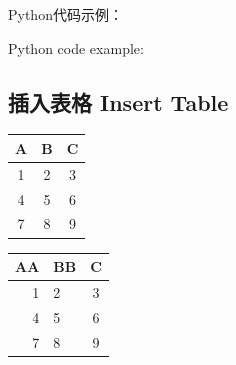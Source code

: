\documentclass{article}
\begin{document}


\vspace{0.5cm}

Python代码示例：

Python code example:





\subsection{插入表格 Insert Table}

\begin{multicols}{2} %

    \centering
    \label{tab:tab1}
    \begin{tabular}{|c|c|c|}                            %
        \hline                                          %
        A & B & C \\
        \hline
        1 & 2 & 3 \\
        \hline
        4 & 5 & 6 \\
        \hline
        7 & 8 & 9 \\
        \hline
    \end{tabular}
    
    \columnbreak %
    
    \centering
    \label{tab:tab2}
    \begin{tabular}{r||l c|}
        \hline
        AA & BB & C \\
        \hline
        1 & 2 & 3 \\
        4 & 5 & 6 \\
        \hline
        \hline
        7 & 8 & 9 \\
    \end{tabular}
    
\end{multicols}
\end{document}
